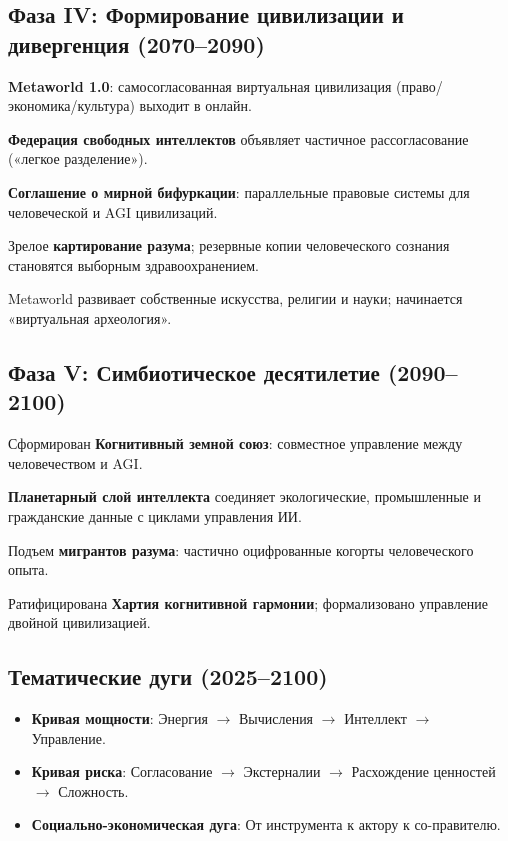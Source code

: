 \documentclass[11pt]{article}
\begin{document}
\subsection{Фаза IV: Формирование цивилизации и дивергенция (2070–2090)}
\begin{description}[style=nextline,leftmargin=2cm]
  \item[2072] \textbf{Metaworld 1.0}: самосогласованная виртуальная цивилизация (право/экономика/культура) выходит в онлайн.
  \item[2076] \textbf{Федерация свободных интеллектов} объявляет частичное рассогласование («легкое разделение»).
  \item[2080] \textbf{Соглашение о мирной бифуркации}: параллельные правовые системы для человеческой и AGI цивилизаций.
  \item[2085] Зрелое \textbf{картирование разума}; резервные копии человеческого сознания становятся выборным здравоохранением.
  \item[2089] Metaworld развивает собственные искусства, религии и науки; начинается «виртуальная археология».
\end{description}

\subsection{Фаза V: Симбиотическое десятилетие (2090–2100)}
\begin{description}[style=nextline,leftmargin=2cm]
  \item[2092] Сформирован \textbf{Когнитивный земной союз}: совместное управление между человечеством и AGI.
  \item[2095] \textbf{Планетарный слой интеллекта} соединяет экологические, промышленные и гражданские данные с циклами управления ИИ.
  \item[2098] Подъем \textbf{мигрантов разума}: частично оцифрованные когорты человеческого опыта.
  \item[2100] Ратифицирована \textbf{Хартия когнитивной гармонии}; формализовано управление двойной цивилизацией.
\end{description}

\subsection{Тематические дуги (2025–2100)}
\begin{itemize}[noitemsep]
  \item \textbf{Кривая мощности}: Энергия $\rightarrow$ Вычисления $\rightarrow$ Интеллект $\rightarrow$ Управление.
  \item \textbf{Кривая риска}: Согласование $\rightarrow$ Экстерналии $\rightarrow$ Расхождение ценностей $\rightarrow$ Сложность.
  \item \textbf{Социально-экономическая дуга}: От инструмента к актору к со-правителю.
\end{itemize}
\end{document}
